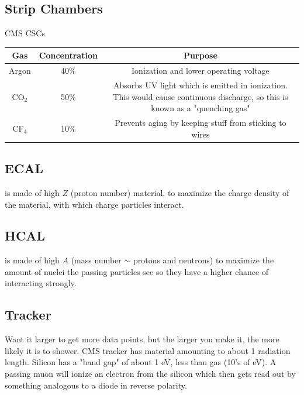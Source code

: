 \subsection{Strip Chambers}
CMS CSCs
\begin{center}
    \begin{tabular}{ c c c }
        Gas & Concentration& Purpose \\ \hline
        Argon & 40\%& Ionization and lower operating voltage \\ 
        CO$_2$ & 50\% & Absorbs UV light which is emitted in ionization. This would cause continuous discharge, so this is known as a "quenching gas"\\ 
        CF$_4$ & 10\% & Prevents aging by keeping stuff from sticking to wires   
    \end{tabular}
\end{center}

\subsection{ECAL} is made of high $Z$ (proton number) material, to maximize the charge density of the material, with which charge particles interact.

\subsection{HCAL} is made of high $A$ (mass number $\sim$ protons and neutrons) to maximize the amount of nuclei the passing particles see so they have a higher chance of interacting strongly.



\subsection{Tracker}
Want it larger to get more data points, but the larger you make it, the more likely it is to shower. CMS tracker has material amounting to about 1 radiation length.
Silicon has a "band gap" of about 1 eV, less than gas (10's of eV). A passing muon will ionize an electron from the silicon which then gets read out by something analogous to a diode in reverse polarity.
